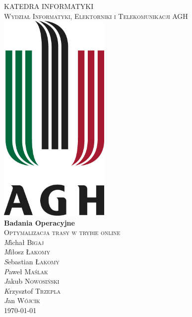 \begin{titlepage}
\begin{center}

\textsc{\Huge KATEDRA INFORMATYKI}\\[1.0cm]
\textsc{\LARGE Wydział Informatyki, Elektorniki i Telekomunikacji AGH}\\[1.0cm]
\includegraphics[width=0.4\textwidth]{../images/logo}~\\[0.5cm]

{ \Huge \bfseries Badania Operacyjne}\\[0.2cm]
\textsc{\Large Optymalizacja trasy w trybie online}\\[0.5cm]

\emph Michał \textsc{Bigaj} \\
\emph Miłosz \textsc{Łakomy} \\
\emph Sebastian \textsc{Łakomy} \\
\emph Paweł \textsc{Maślak} \\
\emph Jakub \textsc{Nowosiński} \\
\emph Krzysztof \textsc{Trzepla} \\
\emph Jan \textsc{Wójcik} \\

\vfill
{\large \today}

\end{center}
\end{titlepage}
